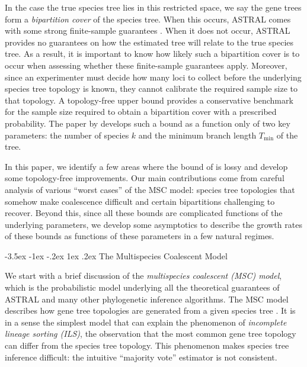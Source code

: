 \documentclass[10pt,oneside,reqno]{article}
\makeatletter
\theoremstyle{plain}
\theoremstyle{definition}
\numberwithin{equation}{section}
\def\subsection#1{\@startsection {subsection}{2}{0pt}%
{-3.5ex \@plus -1ex \@minus -.2ex}%
{1ex \@plus.2ex}%
{\bf\mathversion{bold}}{#1}}
\renewcommand{\cite}{\citep}
\makeatother
\begin{document}
    In the case the true species tree lies in this restricted space, we say the gene trees form 
    a \textit{bipartition cover} of the species tree. When this occurs, ASTRAL comes with some strong 
    finite-sample guarantees \cite{shekhar2018_how_many_genes_are_enough}. When it does not occur, 
    ASTRAL provides no guarantees on how the estimated tree will relate to the true species tree. As a result, 
    it is important to know how likely such a bipartition cover is to occur when assessing whether these finite-sample guarantees apply.
    Moreover, since an experimenter must decide how many loci to collect before the underlying species 
    tree topology is known, they cannot calibrate the required sample size to that topology. A topology-free upper bound 
    provides a conservative benchmark for the sample size required to obtain a bipartition cover with a prescribed 
    probability. The paper by \citet{uricchio2016_bipartition_cover} develops 
    such a bound as a function only of two key parameters: the number of species $k$ and the minimum
    branch length $T_{\mathrm{min}}$ of the tree.

    In this paper, we identify a few areas where the bound of \citet{uricchio2016_bipartition_cover} 
    is lossy and develop some topology-free improvements. Our main contributions come from careful analysis 
    of various ``worst cases'' of the MSC model: species tree topologies that somehow make coalescence 
    difficult and certain bipartitions challenging to recover. Beyond this, since all these bounds are 
    complicated functions of the underlying parameters, we develop some asymptotics to describe 
    the growth rates of these bounds as functions of these parameters in a few natural regimes.



\subsection{The Multispecies Coalescent Model}
\label{sec:multispecies-coalescent-model}

We start with a brief discussion of the \textit{multispecies coalescent (MSC) model}, which is 
the probabilistic model underlying all the theoretical guarantees of ASTRAL and many other phylogenetic
 inference algorithms. The MSC model describes how gene tree topologies are generated from a 
 given species tree \citep{yang2003bayes,rannala2020msc}. It is in a sense the simplest model 
 that can explain the phenomenon of \textit{incomplete lineage sorting (ILS)}, the observation 
 that the most common gene tree topology can differ from the species tree topology. 
 This phenomenon makes species tree inference difficult: the intuitive ``majority vote'' estimator
  is not consistent. 
\end{document}
